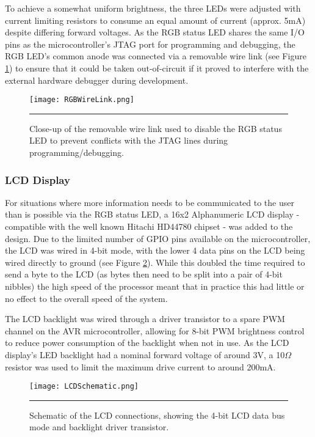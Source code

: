 To achieve a somewhat uniform brightness, the three LEDs were adjusted with current limiting resistors to consume an equal amount of current (approx. 5mA) despite differing forward voltages. As the RGB status LED shares the same I/O pins as the microcontroller's JTAG port for programming and debugging, the RGB LED's common anode was connected via a removable wire link (see Figure \ref{fig:rgbwirelink}) to ensure that it could be taken out-of-circuit if it proved to interfere with the external hardware debugger during development.

\begin{figure}[tbph]
	\centering
		\texttt{[image: RGBWireLink.png]}
	\rule{35em}{0.5pt}
	\caption[Close-up of the RGB LED's Removable Wire Link]{Close-up of the removable wire link used to disable the RGB status LED to prevent conflicts with the JTAG lines during programming/debugging.}
	\label{fig:rgbwirelink}
\end{figure}

\FloatBarrier
\subsubsection{LCD Display}

For situations where more information needs to be communicated to the user than is possible via the RGB status LED, a 16x2 Alphanumeric LCD display - compatible with the well known Hitachi HD44780 chipset - was added to the design. Due to the limited number of GPIO pins available on the microcontroller, the LCD was wired in 4-bit mode, with the lower 4 data pins on the LCD being wired directly to ground (see Figure \ref{fig:lcdschematic}). While this doubled the time required to send a byte to the LCD (as bytes then need to be split into a pair of 4-bit nibbles) the high speed of the processor meant that in practice this had little or no effect to the overall speed of the system.

The LCD backlight was wired through a driver transistor to a spare PWM channel on the AVR microcontroller, allowing for 8-bit PWM brightness control to reduce power consumption of the backlight when not in use. As the LCD display's LED backlight had a nominal forward voltage of around 3V, a 10\ensuremath{\Omega} resistor was used to limit the maximum drive current to around 200mA.

\begin{figure}[tbph]
	\centering
		\texttt{[image: LCDSchematic.png]}
	\rule{35em}{0.5pt}
	\caption[LCD Display Schematic]{Schematic of the LCD connections, showing the 4-bit LCD data bus mode and backlight driver transistor.}
	\label{fig:lcdschematic}
\end{figure}

